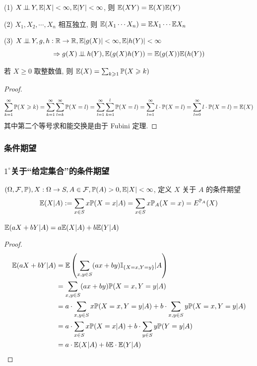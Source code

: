 \begin{theorem}
    (1) $X\operatorname{\perp\!\!\!\perp} Y, \mathbb E|X|<\infty, \mathbb E|Y|<\infty$, 则 $\mathbb E(XY)=\mathbb E(X)\mathbb E(Y)$

    (2) $X_1,X_2,\cdots,X_n$ 相互独立, 则 $\mathbb E(X_1\cdots X_n)=\mathbb E X_1\cdots \mathbb E X_n$

    (3) $X\operatorname{\perp\!\!\!\perp} Y, g,h:\mathbb{R}\rightarrow\mathbb{R}, \mathbb E|g(X)|<\infty, \mathbb E|h(Y)|<\infty$
    \[
    \Rightarrow g(X)\operatorname{\perp\!\!\!\perp} h(Y), \mathbb E(g(X)h(Y))=\mathbb E(g(X))\mathbb E(h(Y))
    \]
\end{theorem}

\begin{theorem}\label{thm:thm1.11}
    若 $X\geq 0$ 取整数值, 则 $\mathbb E (X)=\sum_{k\geqslant 1}\mathbb{P}(X\geqslant k)$
\end{theorem}
\begin{proof}
\[
\sum_{k=1}^{\infty}\mathbb{P}(X\geqslant k)=\sum_{k=1}^{\infty}\sum_{l=k}^{\infty}\mathbb{P}(X=l)=\sum_{l=1}^{\infty}\sum_{k=1}^l \mathbb{P}(X=l)=\sum_{l=1}^{\infty}l\cdot \mathbb{P}(X=l)=\sum_{l=0}^{\infty}l\cdot \mathbb{P}(X=l)=\mathbb E(X)
\]
其中第二个等号求和能交换是由于 Fubini 定理.
\end{proof}

\subsubsection{条件期望}

\subsubsection*{$1^\circ$关于“给定集合”的条件期望}

\begin{definition}\label{def:set_con_exp}
    $(\Omega, \mathcal{F}, \mathbb{P}), X:\Omega\rightarrow S, A\in \mathcal{F}, \mathbb{P}(A)>0, \mathbb E|X|<\infty$, 定义 $X$ 关于 $A$ 的条件期望
    \[
    \mathbb E(X|A):=\sum_{x\in S}x\mathbb{P}(X=x|A)=\sum_{x\in S}x\mathbb{P}_A(X=x)=E^{\mathbb{P}_A}(X)
    \]
\end{definition}

\begin{property}[线性性]\label{prop:linearity1}
$\mathbb E(aX+bY|A)=a\mathbb E(X|A)+b\mathbb E(Y|A)$
\end{property}

\begin{proof}
\[
\begin{aligned}
    \mathbb E(aX+bY|A)
    &=\mathbb E\left(
        \sum_{x,y\in S}(ax+by)\mathbb I_{\{X=x,Y=y\}}|A
    \right)\\
    &=\sum_{x,y\in S}(ax+by)\mathbb{P}(X=x,Y=y|A)\\
    &=a\cdot \sum_{x,y\in S}x\mathbb{P}(X=x,Y=y|A)+b\cdot \sum_{x,y\in S}y\mathbb{P}(X=x,Y=y|A)\\
    &=a\cdot \sum_{x\in S}x\mathbb{P}(X=x|A)+b\cdot \sum_{y\in S}y\mathbb{P}(Y=y|A)\\
    &=a\cdot \mathbb E(X|A)+b\mathbb E\cdot \mathbb E(Y|A)
\end{aligned}
\]
\end{proof}

